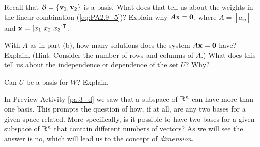\begin{pa}
	\item Recall that $\mathcal{B} = \{\mathbf{v}_1, \mathbf{v}_2\}$ is a basis. What does that tell us about the weights in the linear combination (\ref{eq:PA2.9_5})? Explain why $A \mathbf{x} = \mathbf{0}$, where $A = [a_{ij}]$ and $\vx = [x_1 \ x_2 \ x_3]^{\tr}$. 

	\item With $A$ as in part (b), how many solutions does the system $A \mathbf{x} = \mathbf{0}$ have? Explain. (Hint: Consider the number of rows and columns of $A$.) What does this tell us about the independence or dependence of the set $U$? Why?


	\item Can $U$ be a basis for $W$? Explain. 

	\ea

\ee

\end{pa}


\label{sec:dim_sub_rn}

In Preview Activity \ref{pa:3_d} we saw that a subspace of $\mathbb{R}^n$ can have more than one basis. This prompts the question of how, if at all, are any two bases for a given space related. More specifically, is it possible to have two bases for a given subspace of $\mathbb{R}^n$ that contain different numbers of vectors? As we will see the answer is no, which will lead us to the concept of \emph{dimension}. 

